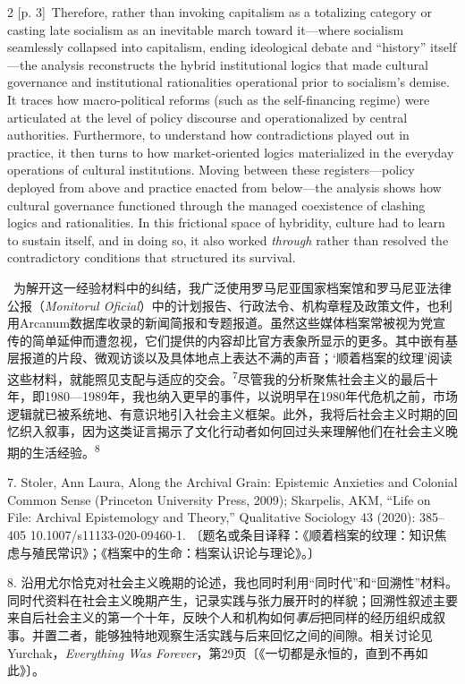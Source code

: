 \documentclass[10pt,a4paper]{article}
\begin{document}
\begin{paracol}{2}
{\scriptsize\color{gray} [p. 3]}\ Therefore, rather than invoking capitalism as a totalizing category or casting late socialism as an inevitable march toward it—where socialism seamlessly collapsed into capitalism, ending ideological debate and “history” itself—the analysis reconstructs the hybrid institutional logics that made cultural governance and institutional rationalities operational prior to socialism’s demise. It traces how macro-political reforms (such as the self-financing regime) were articulated at the level of policy discourse and operationalized by central authorities. Furthermore, to understand how contradictions played out in practice, it then turns to how market-oriented logics materialized in the everyday operations of cultural institutions. Moving between these registers—policy deployed from above and practice enacted from below—the analysis shows how cultural governance functioned through the managed coexistence of clashing logics and rationalities. In this frictional space of hybridity, culture had to learn to sustain itself, and in doing so, it also worked \textit{through} rather than resolved the contradictory conditions that structured its survival.\par
\switchcolumn*
{\scriptsize\color{gray} [p. 3]}\ 为解开这一经验材料中的纠结，我广泛使用罗马尼亚国家档案馆和罗马尼亚法律公报（\textit{Monitorul Oficial}）中的计划报告、行政法令、机构章程及政策文件，也利用Arcanum数据库收录的新闻简报和专题报道。虽然这些媒体档案常被视为党宣传的简单延伸而遭忽视，它们提供的内容却比官方表象所显示的更多。其中嵌有基层报道的片段、微观访谈以及具体地点上表达不满的声音；‘顺着档案的纹理’阅读这些材料，就能照见支配与适应的交\mbox{会。\textsuperscript{7}}尽管我的分析聚焦社会主义的最后十年，即1980—1989年，我也纳入更早的事件，以说明早在1980年代危机之前，市场逻辑就已被系统地、有意识地引入社会主义框架。此外，我将后社会主义时期的回忆织入叙事，因为这类证言揭示了文化行动者如何回过头来理解他们在社会主义晚期的生活经\mbox{验。\textsuperscript{8}}\par{\small 7. Stoler, Ann Laura, Along the Archival Grain: Epistemic Anxieties and Colonial Common Sense (Princeton University Press, 2009); Skarpelis, AKM, “Life on File: Archival Epistemology and Theory,” Qualitative Sociology 43 (2020): 385–405 10.1007/s11133-020-09460-1. 〔题名或条目译释：《顺着档案的纹理：知识焦虑与殖民常识》；《档案中的生命：档案认识论与理论》。〕\par}{\small 8. 沿用尤尔恰克对社会主义晚期的论述，我也同时利用“同时代”和“回溯性”材料。同时代资料在社会主义晚期产生，记录实践与张力展开时的样貌；回溯性叙述主要来自后社会主义的第一个十年，反映个人和机构如何\textit{事后}把同样的经历组织成叙事。并置二者，能够独特地观察生活实践与后来回忆之间的间隙。相关讨论见Yurchak，\textit{Everything Was Forever}，第29页〔《一切都是永恒的，直到不再如此》〕。\par}

\end{paracol}
\end{document}
